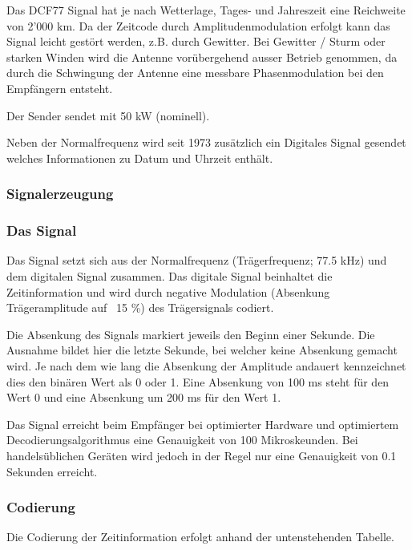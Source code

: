 Das DCF77 Signal hat je nach Wetterlage, Tages- und Jahreszeit eine Reichweite von 2'000 km. Da der Zeitcode durch Amplitudenmodulation erfolgt kann das Signal leicht gestört werden, z.B. durch Gewitter. Bei Gewitter / Sturm oder starken Winden wird die Antenne vorübergehend ausser Betrieb genommen, da durch die Schwingung der Antenne eine messbare Phasenmodulation bei den Empfängern entsteht.

Der Sender sendet mit 50 kW (nominell).

Neben der Normalfrequenz wird seit 1973 zusätzlich ein Digitales Signal gesendet welches Informationen zu Datum und Uhrzeit enthält.


\subsubsection{Signalerzeugung}


\subsubsection{Das Signal}
Das Signal setzt sich aus der Normalfrequenz (Trägerfrequenz; 77.5 kHz) und dem digitalen Signal zusammen. Das digitale Signal beinhaltet die Zeitinformation und wird durch negative Modulation (Absenkung Trägeramplitude auf ~15 \%) des Trägersignals codiert.

Die Absenkung des Signals markiert jeweils den Beginn einer Sekunde. Die Ausnahme bildet hier die letzte Sekunde, bei welcher keine Absenkung gemacht wird. Je nach dem wie lang die Absenkung der Amplitude andauert kennzeichnet dies den binären Wert als 0 oder 1. Eine Absenkung von 100 ms steht für den Wert 0 und eine Absenkung um 200 ms für den Wert 1.

Das Signal erreicht beim Empfänger bei optimierter Hardware und optimiertem Decodierungsalgorithmus eine Genauigkeit von 100 Mikroskeunden. Bei handelsüblichen Geräten wird jedoch in der Regel nur eine Genauigkeit von 0.1 Sekunden erreicht.


\subsubsection{Codierung}
Die Codierung der Zeitinformation erfolgt anhand der untenstehenden Tabelle.

